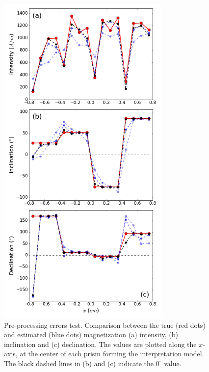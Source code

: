 \documentclass[draft,gc]{agutex}
\begin{document}
 \begin{figure}
 \noindent \includegraphics[width=20pc]{Figs/Fig8_LQ.png}
 \caption{Pre-processing errors test. Comparison between the true (red dots)
 and estimated (blue dots) magnetization (a) intensity, (b) inclination 
 and (c) declination.
 The values are plotted along the $x$-axis, at the center of each 
 prism forming the interpretation model.
 The black dashed lines in (b) and (c) indicate the $0^{\circ}$ value.}
 \label{fig:estimate-pre-processing}
 \end{figure}
\end{document}
